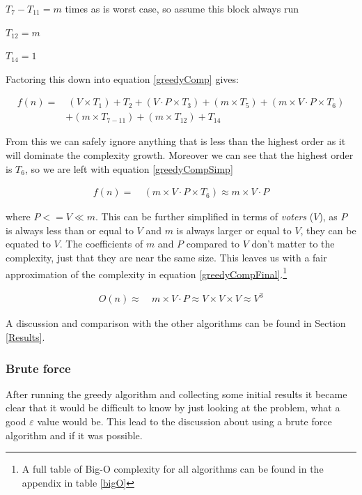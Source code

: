 \documentclass[12pt]{report}
\begin{document}
$T_7 - T_{11}= m$ times as is worst case, so assume this block always run

$T_{12}= m$

$T_{14} = 1$

Factoring this down into equation \ref{greedyComp} gives: 

\begin{equation}\label{greedyComp}
\begin{aligned}
	f(n) ={} & \ (V \times T_1) + T_2 + (V \cdot P \times T_3) + (m \times T_5) + (m \times V \cdot P \times T_6) \\
	 	& + (m \times T_{7 - 11}) + (m \times T_{12}) + T_{14}
\end{aligned}
\end{equation}

From this we can safely ignore anything that is less than the highest order as it will dominate the complexity growth. Moreover we can see that the highest order is $T_6$, so we are left with equation \ref{greedyCompSimp}

\begin{equation}\label{greedyCompSimp}
\begin{aligned}
	f(n) ={} & \ (m \times V \cdot P \times T_6) \approx m \times V \cdot P
\end{aligned}
\end{equation}

where $P <= V \ll m$. This can be further simplified in terms of \textit{voters} ($V$), as $P$ is always less than or equal to $V$ and $m$ is always larger or equal to $V$, they can be equated to $V$. The coefficients of $m$ and $P$ compared to $V$ don't matter to the complexity, just that they are near the same size. This leaves us with a fair approximation of the complexity in equation \ref{greedyCompFinal}.\footnote{A full table of Big-O complexity for all algorithms can be found in the appendix in table \ref{bigO}}

\begin{equation}\label{greedyCompFinal}
\begin{aligned}
	O(n) \approx{} & \ m \times V \cdot P \approx V \times V \times V \approx V^3
\end{aligned}
\end{equation}

A discussion and comparison with the other algorithms can be found in Section \ref{Results}.

\subsubsection{Brute force}
After running the greedy algorithm and collecting some initial results it became clear that it would be difficult to know by just looking at the problem, what a good $\varepsilon$ value would be. This lead to the discussion about using a brute force algorithm and if it was possible. 
\end{document}
